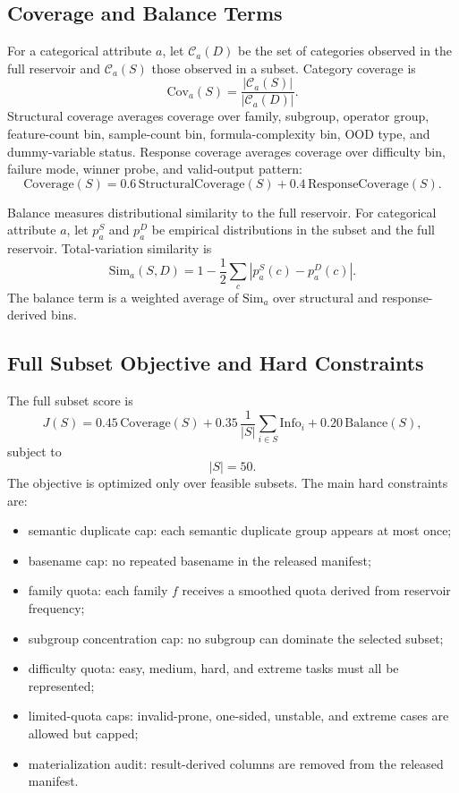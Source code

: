 \subsection{Coverage and Balance Terms}
\label{app:coverage-balance}

For a categorical attribute \(a\), let \(\mathcal{C}_a(D)\) be the set of categories observed in the full reservoir and \(\mathcal{C}_a(S)\) those observed in a subset. Category coverage is
\[
\mathrm{Cov}_a(S)
=
\frac{
|\mathcal{C}_a(S)|
}{
|\mathcal{C}_a(D)|
}.
\]
Structural coverage averages coverage over family, subgroup, operator group, feature-count bin, sample-count bin, formula-complexity bin, OOD type, and dummy-variable status. Response coverage averages coverage over difficulty bin, failure mode, winner probe, and valid-output pattern:
\[
\mathrm{Coverage}(S)
=
0.6\,\mathrm{StructuralCoverage}(S)
+
0.4\,\mathrm{ResponseCoverage}(S).
\]

Balance measures distributional similarity to the full reservoir. For categorical attribute \(a\), let \(p_a^S\) and \(p_a^D\) be empirical distributions in the subset and the full reservoir. Total-variation similarity is
\[
\mathrm{Sim}_a(S,D)
=
1
-
\frac{1}{2}
\sum_c
|p_a^S(c)-p_a^D(c)|.
\]
The balance term is a weighted average of \(\mathrm{Sim}_a\) over structural and response-derived bins.


\subsection{Full Subset Objective and Hard Constraints}
\label{app:core50-objective-constraints}

The full subset score is
\[
J(S)
=
0.45\,\mathrm{Coverage}(S)
+
0.35\,\frac{1}{|S|}
\sum_{i\in S}\mathrm{Info}_i
+
0.20\,\mathrm{Balance}(S),
\]
subject to
\[
|S|=50.
\]
The objective is optimized only over feasible subsets. The main hard constraints are:
\begin{itemize}[leftmargin=*]
    \item semantic duplicate cap: each semantic duplicate group appears at most once;
    \item basename cap: no repeated basename in the released \core{} manifest;
    \item family quota: each family \(f\) receives a smoothed quota derived from reservoir frequency;
    \item subgroup concentration cap: no subgroup can dominate the selected subset;
    \item difficulty quota: easy, medium, hard, and extreme tasks must all be represented;
    \item limited-quota caps: invalid-prone, one-sided, unstable, and extreme cases are allowed but capped;
    \item materialization audit: result-derived columns are removed from the released manifest.
\end{itemize}

